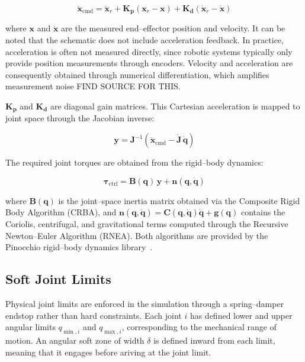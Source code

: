 \documentclass[11pt,a4paper,twoside,openright]{book}
\begin{document}
\begin{equation}\label{eq:xyz-acc}
    \ddot{\mathbf{x}}_{\mathrm{cmd}} =
    \ddot{\mathbf{x}}_r +
    \mathbf{K_p}(\mathbf{x}_r - \mathbf{x}) +
    \mathbf{K_d}(\dot{\mathbf{x}}_r - \dot{\mathbf{x}})
\end{equation}

where $\mathbf{x}$ and $\dot{\mathbf{x}}$ are the measured end--effector position and velocity. It can be noted that the schematic does not include acceleration feedback. In practice, acceleration is often not measured directly, since robotic systems typically only provide position measurements through encoders. Velocity and acceleration are consequently obtained through numerical differentiation, which amplifies measurement noise FIND SOURCE FOR THIS.

$\mathbf{K_p}$ and $\mathbf{K_d}$ are diagonal gain matrices. This Cartesian acceleration is mapped to joint space through the Jacobian inverse:

\begin{equation}\label{eq:joint-acc}
    \mathbf{y} =
    \mathbf{J}^{-1}\left(
    \ddot{\mathbf{x}}_{\mathrm{cmd}} - \dot{\mathbf{J}}\,\dot{\mathbf{q}}
    \right)
\end{equation}

The required joint torques are obtained from the rigid--body dynamics:

\begin{equation}\label{eq:torques}
    \boldsymbol{\tau}_{\mathrm{ctrl}} =
    \mathbf{B}(\mathbf{q})\,\mathbf{y} +
    \mathbf{n}(\mathbf{q}, \dot{\mathbf{q}})
\end{equation}

where $\mathbf{B}(\mathbf{q})$ is the joint--space inertia matrix obtained via the Composite Rigid Body Algorithm (CRBA), and $\mathbf{n}(\mathbf{q}, \dot{\mathbf{q}}) = \mathbf{C}(\mathbf{q}, \dot{\mathbf{q}})\dot{\mathbf{q}} + \mathbf{g}(\mathbf{q})$ contains the Coriolis, centrifugal, and gravitational terms computed through the Recursive Newton--Euler Algorithm (RNEA). Both algorithms are provided by the Pinocchio rigid--body dynamics library~\cite{Pinocchio}.

\subsection{Soft Joint Limits}
\label{subsec:soft-limits}

Physical joint limits are enforced in the simulation through a spring--damper endstop rather than hard constraints. Each joint $i$ has defined lower and upper angular limits $q_{\min,i}$ and $q_{\max,i}$, corresponding to the mechanical range of motion. An angular soft zone of width $\delta$ is defined inward from each limit, meaning that it engages before ariving at the joint limit.
\end{document}
